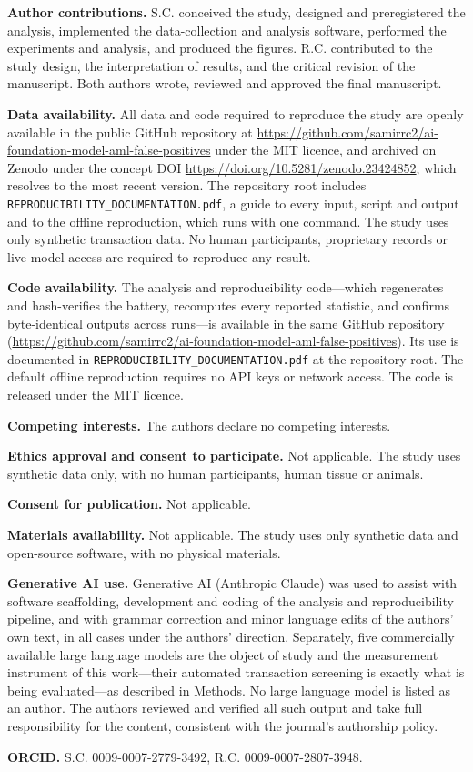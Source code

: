 \documentclass[pdflatex,sn-basic,Numbered]{sn-jnl}
\begin{document}
\textbf{Author contributions.} S.C. conceived the study, designed and preregistered the analysis, implemented the data-collection and analysis software, performed the experiments and analysis, and produced the figures. R.C. contributed to the study design, the interpretation of results, and the critical revision of the manuscript. Both authors wrote, reviewed and approved the final manuscript.

\textbf{Data availability.} All data and code required to reproduce the study are openly available in the public GitHub repository at \url{https://github.com/samirrc2/ai-foundation-model-aml-false-positives} under the MIT licence, and archived on Zenodo under the concept DOI \url{https://doi.org/10.5281/zenodo.23424852}, which resolves to the most recent version. The repository root includes \texttt{REPRODUCIBILITY\_DOCUMENTATION.pdf}, a guide to every input, script and output and to the offline reproduction, which runs with one command. The study uses only synthetic transaction data. No human participants, proprietary records or live model access are required to reproduce any result.

\textbf{Code availability.} The analysis and reproducibility code---which regenerates and hash-verifies the battery, recomputes every reported statistic, and confirms byte-identical outputs across runs---is available in the same GitHub repository (\url{https://github.com/samirrc2/ai-foundation-model-aml-false-positives}). Its use is documented in \texttt{REPRODUCIBILITY\_DOCUMENTATION.pdf} at the repository root. The default offline reproduction requires no API keys or network access. The code is released under the MIT licence.

\textbf{Competing interests.} The authors declare no competing interests.

\textbf{Ethics approval and consent to participate.} Not applicable. The study uses synthetic data only, with no human participants, human tissue or animals.

\textbf{Consent for publication.} Not applicable.

\textbf{Materials availability.} Not applicable. The study uses only synthetic data and open-source software, with no physical materials.

\textbf{Generative AI use.} Generative AI (Anthropic Claude) was used to assist with software scaffolding, development and coding of the analysis and reproducibility pipeline, and with grammar correction and minor language edits of the authors' own text, in all cases under the authors' direction. Separately, five commercially available large language models are the object of study and the measurement instrument of this work---their automated transaction screening is exactly what is being evaluated---as described in Methods. No large language model is listed as an author. The authors reviewed and verified all such output and take full responsibility for the content, consistent with the journal's authorship policy.

\textbf{ORCID.} S.C. 0009-0007-2779-3492, R.C. 0009-0007-2807-3948.


\end{document}
